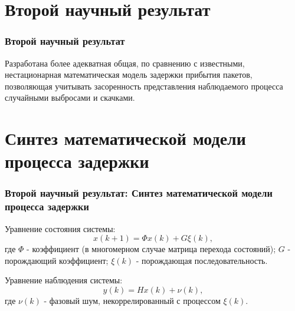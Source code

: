 \documentclass[10pt,pdf,hyperref={unicode}]{beamer}
\begin{document}
\begin{frame}
\begin{scriptsize}
\begin{figure} [!bth]
\begin{scriptsize}
\begin{minipage}[h]{0.95\linewidth}
  \end{minipage}
\end{scriptsize}
\end{figure}
\end{scriptsize}
\end{frame}

\section{Второй научный результат}

\begin{frame}
\frametitle{Второй научный результат}

{\Large Разработана более адекватная общая, по сравнению с известными, нестационарная математическая модель задержки прибытия пакетов, позволяющая учитывать засоренность представления наблюдаемого процесса случайными выбросами и скачками.}

\end{frame}



\section{Синтез математической модели процесса задержки}
\begin{frame}
\frametitle{Второй научный результат: Синтез математической модели процесса задержки}
Уравнение состояния системы:
\begin{equation}\label{eq3:modelStat}
x(k+1)=\Phi x(k)+G\xi(k),
\end{equation}
где $\Phi$ - коэффициент (в многомерном случае матрица перехода состояний); $G$ - порождающий коэффициент; $\xi(k)$ - порождающая последовательность.

Уравнение наблюдения системы:
\begin{equation}\label{eq3:Estim}
y(k)=Hx(k)+\nu(k),
\end{equation}
где $\nu(k)$ - фазовый шум, некоррелированный с процессом $\xi(k)$.
\end{frame}
\end{document}
